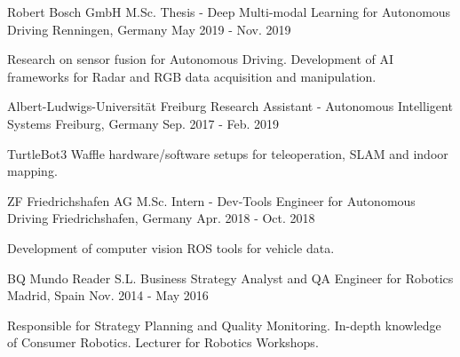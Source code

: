 \begin{cventries}
\vspace{0cm}
\cventry
  {Robert Bosch GmbH} %
  {M.Sc. Thesis - Deep Multi-modal Learning for Autonomous Driving} %
  {Renningen, Germany} %
  {May 2019 - Nov. 2019} %
  {
    \begin{cvitemone} %
      \item {Research on sensor fusion for Autonomous Driving. Development of AI frameworks for Radar and RGB data acquisition and manipulation.}
    \end{cvitemone}
  }

\vspace{0cm}
\cventry
  {Albert-Ludwigs-Universität Freiburg} %
  {Research Assistant - Autonomous Intelligent Systems} %
  {Freiburg, Germany} %
  {Sep. 2017 - Feb. 2019} %
  {
    \begin{cvitemone} %
      \item {TurtleBot3 Waffle hardware/software setups for teleoperation, SLAM and indoor mapping.}
    \end{cvitemone}
  }

\vspace{0cm}
\cventry
  {ZF Friedrichshafen AG} %
  {M.Sc. Intern - Dev-Tools Engineer for Autonomous Driving} %
  {Friedrichshafen, Germany} %
  {Apr. 2018 - Oct. 2018} %
  {
    \begin{cvitemone} %
      \item {Development of computer vision ROS tools for vehicle data.}
    \end{cvitemone}
  }

\cventry
   {BQ Mundo Reader S.L.} %
   {Business Strategy Analyst and QA Engineer for Robotics} %
   {Madrid, Spain} %
   {Nov. 2014 - May 2016} %
   {
     \begin{cvitemone} %
       \item {Responsible for Strategy Planning and Quality Monitoring. In-depth knowledge of Consumer Robotics. Lecturer for Robotics Workshops.}
     \end{cvitemone}
   }

\end{cventries}
